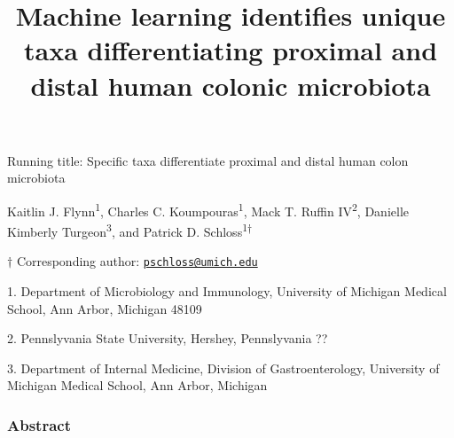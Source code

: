 \documentclass[11pt,]{article}
\title{\textbf{Machine learning identifies unique taxa differentiating proximal
and distal human colonic microbiota}}
\author{}
\date{}
\begin{document}
\maketitle

\vspace{35mm}

Running title: Specific taxa differentiate proximal and distal human
colon microbiota

\vspace{35mm}

Kaitlin J. Flynn\textsuperscript{1}, Charles C.
Koumpouras\textsuperscript{1}, Mack T. Ruffin IV\textsuperscript{2},
Danielle Kimberly Turgeon\textsuperscript{3}, and Patrick D.
Schloss\textsuperscript{1\(\dagger\)}

\vspace{35mm}

\(\dagger\) Corresponding author:
\href{mailto:pschloss@umich.edu}{\nolinkurl{pschloss@umich.edu}}

1. Department of Microbiology and Immunology, University of Michigan
Medical School, Ann Arbor, Michigan 48109

2. Pennslyvania State University, Hershey, Pennslyvania ??

3. Department of Internal Medicine, Division of Gastroenterology,
University of Michigan Medical School, Ann Arbor, Michigan

\newpage

\linenumbers

\subsubsection{Abstract}\label{abstract}
\end{document}
